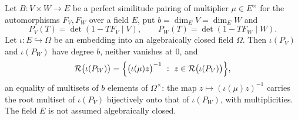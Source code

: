 \begin{corollary}
\label{cor:zla-reciprocal-roots-embedding}
\leanok
Let $B:V\times W\to E$ be a perfect similitude pairing of multiplier
$\mu\in E^\times$ for the automorphisms $F_V,F_W$ over a field $E$, put
$b=\dim_EV=\dim_EW$ and
\[
  P_V(T)=\det(1-TF_V\mid V),
  \qquad
  P_W(T)=\det(1-TF_W\mid W).
\]
Let $\iota:E\hookrightarrow\Omega$ be an embedding into an algebraically
closed field $\Omega$.  Then $\iota(P_V)$ and $\iota(P_W)$ have degree $b$,
neither vanishes at $0$, and
\[
  \mathcal R\bigl(\iota(P_W)\bigr)
  =\Bigl\{\bigl(\iota(\mu)z\bigr)^{-1}
  \ :\ z\in\mathcal R\bigl(\iota(P_V)\bigr)\Bigr\},
\]
an equality of multisets of $b$ elements of $\Omega^\times$: the map
$z\mapsto(\iota(\mu)z)^{-1}$ carries the root multiset of $\iota(P_V)$
bijectively onto that of $\iota(P_W)$, with multiplicities.  The field $E$ is
not assumed algebraically closed.
\end{corollary}
